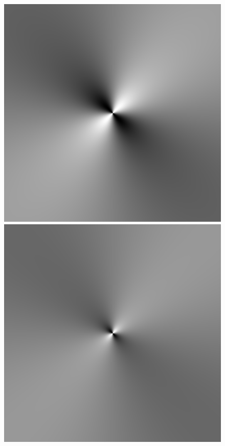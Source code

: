 \begin{figure}
{ }
 \hfill
 \subtop
 {
 \includegraphics[scale=0.25]{figures/unified_dfilt_wur_sqrt8.png}
 }
 \hfill
 \subtop
 {
 \includegraphics[scale=0.25]{figures/unified_dfilt_wur_sqrt50.png}
}
\end{figure}
